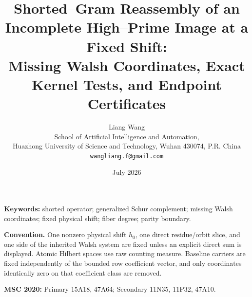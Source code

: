 \documentclass[11pt]{article}
\title{\bfseries Shorted--Gram Reassembly of an Incomplete High--Prime Image at a Fixed Shift:\\
Missing Walsh Coordinates, Exact Kernel Tests, and Endpoint Certificates}
\author{Liang Wang\\
\small School of Artificial Intelligence and Automation,\\[-2pt]
\small Huazhong University of Science and Technology, Wuhan 430074, P.R. China\\
\small \texttt{wangliang.f@gmail.com}}
\date{July 2026}
\theoremstyle{definition}
\theoremstyle{remark}
\begin{document}
\maketitle



\noindent\textbf{Keywords:} shorted operator; generalized Schur complement;
missing Walsh coordinates; fixed physical shift; fiber degree; parity boundary.

\medskip
\noindent\textbf{Convention.}
One nonzero physical shift \(h_0\), one direct residue/orbit slice, and one
side of the inherited Walsh system are fixed unless an explicit direct sum
is displayed.  Atomic Hilbert spaces use raw counting measure.  Baseline
carriers are fixed independently of the bounded row coefficient vector,
and only coordinates identically zero on that coefficient class are removed.

\medskip
\noindent\textbf{MSC 2020:} Primary 15A18, 47A64; Secondary 11N35,
11P32, 47A10.











\begingroup
\raggedright


\endgroup
\end{document}
